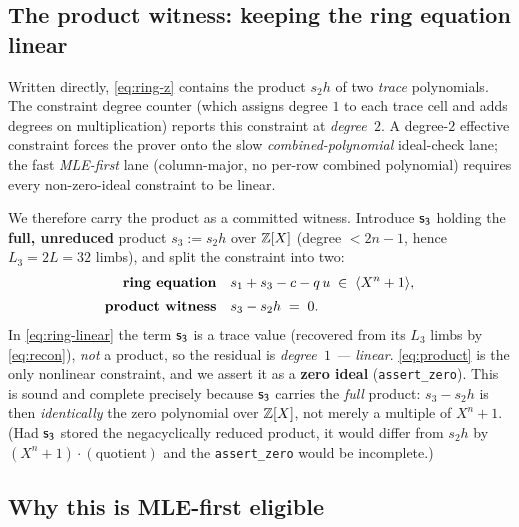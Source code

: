 \subsection{The product witness: keeping the ring equation linear}\label{sec:s3}

Written directly, \cref{eq:ring-z} contains the product $s_2 h$ of two
\emph{trace} polynomials. The constraint degree counter (which assigns
degree $1$ to each trace cell and adds degrees on multiplication) reports
this constraint at \emph{degree~$2$}. A degree-$2$ effective constraint
forces the prover onto the slow \emph{combined-polynomial} ideal-check
lane; the fast \emph{MLE-first} lane (column-major, no per-row combined
polynomial) requires every non-zero-ideal constraint to be linear.

We therefore carry the product as a committed witness. Introduce
$\mathsf{s_3}$ holding the \textbf{full, unreduced} product $s_3 := s_2 h$
over $\mathbb{Z}[X]$ (degree $<2n-1$, hence $L_3 = 2L = 32$ limbs), and split the
constraint into two:
\begin{align}
  \text{\textbf{ring equation}}\quad
    & s_1 + s_3 - c - q\,u \;\in\; \langle X^{n}+1\rangle,
      \label{eq:ring-linear}\\[2pt]
  \text{\textbf{product witness}}\quad
    & s_3 - s_2 h \;=\; 0.
      \label{eq:product}
\end{align}
In \cref{eq:ring-linear} the term $\mathsf{s_3}$ is a trace value (recovered
from its $L_3$ limbs by \cref{eq:recon}), \emph{not} a product, so the
residual is \emph{degree~$1$ --- linear}. \cref{eq:product} is the only
nonlinear constraint, and we assert it as a \textbf{zero ideal}
(\texttt{assert\_zero}). This is sound and complete precisely because
$\mathsf{s_3}$ carries the \emph{full} product: $s_3 - s_2 h$ is then
\emph{identically} the zero polynomial over $\mathbb{Z}[X]$, not merely a multiple
of $X^n+1$. (Had $\mathsf{s_3}$ stored the negacyclically reduced product, it
would differ from $s_2 h$ by $(X^n{+}1)\cdot(\text{quotient})$ and the
\texttt{assert\_zero} would be incomplete.)

\subsection{Why this is MLE-first eligible}\label{sec:mlefirst}


